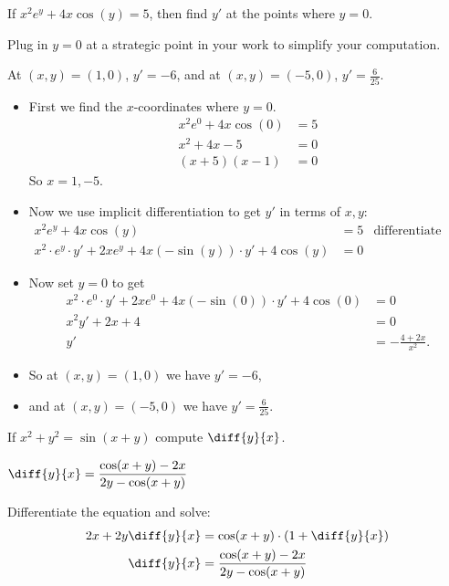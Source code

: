 \begin{question}[2015Q]
If $x^2e^y + 4x\cos(y) = 5$, then find $y'$ at the points where $y=0$.
\end{question}
\begin{hint} Plug in $y=0$ at a strategic point in your work to simplify your computation.
\end{hint}
\begin{answer}
At $(x,y)=(1,0)$,  $y' = -6$,
and at $(x,y)=(-5,0)$,  $y' = \frac{6}{25}$.
\end{answer}
\begin{solution}
\begin{itemize}
 \item First we find the $x$-coordinates where $y=0$.
\begin{align*}
  x^2e^0+4x\cos(0) &= 5 \\
  x^2 +4x - 5 &=0\\
  (x+5)(x-1)&=0
\end{align*}
So $x=1,-5$.
\item Now we use implicit differentiation to get $y'$ in terms of $x,y$:
\begin{align*}
  x^2e^y+4x\cos(y) &= 5 & \text{differentiate both sides} \\
  x^2 \cdot e^y \cdot y' + 2x e^y + 4x(-\sin(y)) \cdot y' + 4\cos(y) &= 0
\end{align*}
\item Now set $y=0$ to get
\begin{align*}
  x^2 \cdot e^0 \cdot y' + 2x e^0 + 4x(-\sin(0)) \cdot y' + 4\cos(0) &= 0  \\
  x^2y' + 2x  + 4 &=0 \\
  y' &= - \frac{4+2x}{x^2}.
\end{align*}
\item So at $(x,y)=(1,0)$ we have $y' = -6$,
\item and at $(x,y)=(-5,0)$ we have $y' = \frac{6}{25}$.
\end{itemize}
\end{solution}


\begin{question}[2015Q]
If $x^2+y^2 = \sin(x+y)$ compute $\diff{y}{x}$.
\end{question}
\begin{answer}
$\diff{y}{x} = \dfrac{\cos(x+y)-2x}{2y-\cos(x+y)}$
\end{answer}
\begin{solution}
 Differentiate the equation  and solve:
\begin{align*}
  2x + 2y \diff{y}{x} &= \cos(x+y) \cdot\left(1 + \diff{y}{x}\right) \\
  \diff{y}{x} &= \frac{\cos(x+y)-2x}{2y-\cos(x+y)}
\end{align*}
\end{solution}


